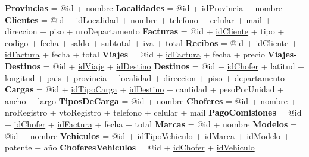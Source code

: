 \documentclass{article}
\begin{document}
\begin{flushleft}
  \textbf{Provincias}                    = @id + nombre
  \newline  \textbf{Localidades}         = @id + \underline{idProvincia} + nombre
  \newline  \textbf{Clientes}            = @id + \underline{idLocalidad} + nombre + telefono + celular + mail + direccion + piso + nroDepartamento
  \newline  \textbf{Facturas}            = @id + \underline{idCliente} + tipo + codigo + fecha + saldo + subtotal + iva + total %
  \newline  \textbf{Recibos}             = @id + \underline{idCliente} + \underline{idFactura} + fecha + total
  \newline
  \newline  \textbf{Viajes}              = @id + \underline{idFactura} + fecha + precio
  \newline  \textbf{Viajes-Destinos}     = @id + \underline{idViaje} + \underline{idDestino}
  \newline  \textbf{Destinos}            = @id + \underline{idChofer} + latitud + longitud + pais + provincia + localidad + direccion + piso + departamento
  \newline  \textbf{Cargas}              = @id + \underline{idTipoCarga} + \underline{idDestino} + cantidad + pesoPorUnidad + ancho + largo
  \newline  \textbf{TiposDeCarga}        = @id + nombre
  \newline  \textbf{Choferes}            = @id + nombre + nroRegistro + vtoRegistro + telefono + celular + mail
  \newline  \textbf{PagoComisiones}      = @id + \underline{idChofer} + \underline{idFactura} + fecha + total
  \newline
  \newline  \textbf{Marcas}              = @id + nombre
  \newline  \textbf{Modelos}             = @id + nombre
  \newline  \textbf{Vehiculos}           = @id + \underline{idTipoVehiculo} + \underline{idMarca} + \underline{idModelo} + patente + año
  \newline  \textbf{ChoferesVehiculos}   = @id + \underline{idChofer} + \underline{idVehiculo}
\end{flushleft}
\end{document}
